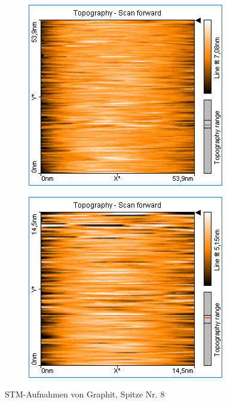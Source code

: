 \centering
\begin{figure}
    \begin{subfigure}[b]{\picwidth}
        \includegraphics[width=\textwidth]{data/Graphit/pic_03_01_50nm}
        \caption{}
        \label{fig:graphit_03_01}
    \end{subfigure}\qquad
    \begin{subfigure}[b]{\picwidth}
        \includegraphics[width=\textwidth]{data/Graphit/pic_03_02_15nm}
        \caption{}
        \label{fig:graphit_03_02}
    \end{subfigure}
    \caption{STM-Aufnahmen von Graphit, Spitze Nr. 8}\label{fig:graphit_03}
\end{figure}

